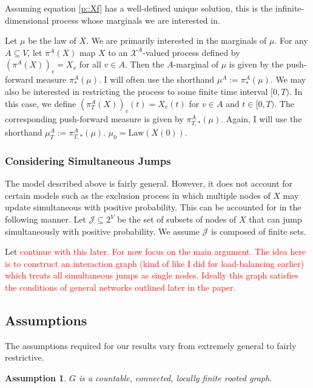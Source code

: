 \documentclass[12pt]{article}
\newcommand{\mc}{\mathcal}
\newcommand{\te}{\text}
\newcommand{\tr}{\textcolor{red}}
\newcommand{\ind}{\hspace{24pt}}
\newcommand{\defeq}{:=}								%
\newcommand{\sta}{\mc{X}}							%
\newcommand{\Xf}{X}									%
\newcommand{\m}{\mu}								%
\newcommand{\proj}{\pi}								%
\newcommand{\vind}[1]{_{#1}}						%
\newcommand{\tme}[1]{(#1)}							%
\newcommand{\vpara}[1]{^{#1}}						%
\newcommand{\tpara}[1]{_{#1}}						%
\newcommand{\psf}{_*}								%
\newcommand{\tparapsf}[1]{_{#1,*}}					%
\newcommand{\Jmps}{\mc{J}}							%
\newcommand{\law}{\te{Law}}							%
\newtheorem{assu}[thms]{Assumption}
\begin{document}
Assuming equation \eqref{p::Xf} has a well-defined unique solution, this is the infinite-dimensional process whose marginals we are interested in.

\ind Let \(\m\) be the law of \(\Xf\). We are primarily interested in the marginals of \(\m\). For any \(A \subseteq V\), let \(\proj\vpara{A}(\Xf)\) map \(\Xf\) to an \(\sta^A\)-valued process defined by \((\proj\vpara{A}(\Xf))\vind{v} = \Xf\vind{v}\) for all \(v\in A\). Then the \(A\)-marginal of \(\m\) is given by the push-forward measure \(\proj\vpara{A}\psf(\m)\). I will often use the shorthand \(\m\vpara{A} \defeq \proj\psf\vpara{A}(\m)\). We may also be interested in restricting the process to some finite time interval \([0,T)\). In this case, we define \((\proj\vpara{A}\tpara{T}(\Xf))\vind{v}\tme{t} = \Xf\vind{v}\tme{t}\) for \(v \in A\) and \(t \in [0,T)\). The corresponding push-forward measure is given by \(\proj\vpara{A}\tparapsf{T}(\m)\). Again, I will use the shorthand \(\m\vpara{A}\tpara{T} \defeq \proj\vpara{A}\tparapsf{T}(\m)\). \(\m\tpara{0} = \law(\Xf\tme{0})\).

\subsubsection{Considering Simultaneous Jumps}
\label{sim::p}

The model described above is fairly general. However, it does not account for certain models such as the exclusion process in which multiple nodes of \(\Xf\) may update simultaneous with positive probability. This can be accounted for in the following manner. Let \(\Jmps \subseteq 2^V\) be the set of subsets of nodes of \(\Xf\) that can jump simultaneously with positive probability. We assume \(\Jmps\) is composed of finite sets. 

Let \tr{continue with this later. For now focus on the main argument. The idea here is to construct an interaction graph (kind of like I did for load-balancing earlier) which treats all simultaneous jumps as single nodes. Ideally this graph satisfies the conditions of general networks outlined later in the paper.}

\subsection{Assumptions}
\label{a::not}

The assumptions required for our results vary from extremely general to fairly restrictive.

\begin{assu}
\(G\) is a countable, connected, locally finite rooted graph.
\label{a::gbasics}
\end{assu}
\end{document}
